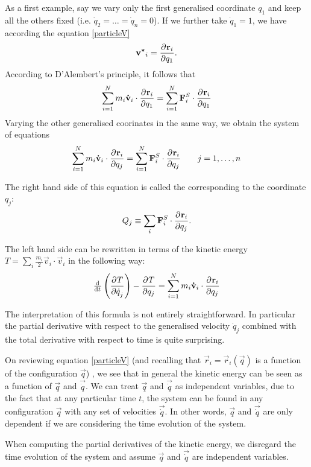 As a first example, say we vary only the first generalised coordinate $q_1$ and keep all the others fixed (i.e. $\dot{q}_2 = \ldots = \dot{q}_n = 0$). If we further take $\dot{q}_1 = 1$, we have according the equation \ref{particleV}
\[ \bm{\mathrm{v^*}}_i =  \frac{\partial{^{}}\bm{\mathrm{r}}_i}{\partial{{q_1}^{}}} . \]
According to D'Alembert's principle, it follows that
\[ \sum^N_{i=1}m_i \bm{\mathrm{\dot{v}}}_i \cdot  \frac{\partial{^{}}\bm{\mathrm{r}}_i}{\partial{{q_1}^{}}}  = \sum^N_{i=1}\bm{\mathrm{F}}^S_i  \cdot  \frac{\partial{^{}}\bm{\mathrm{r}}_i}{\partial{{q_1}^{}}}  \] 
Varying the other generalised coorinates in the same way, we obtain the system of equations
\begin{equation}
\sum^N_{i=1}m_i \bm{\mathrm{\dot{v}}}_i \cdot  \frac{\partial{^{}}\bm{\mathrm{r}}_i}{\partial{{q_j}^{}}}  = \sum^N_{i=1}\bm{\mathrm{F}}^S_i  \cdot  \frac{\partial{^{}}\bm{\mathrm{r}}_i}{\partial{{q_j}^{}}}  \qquad j = 1, \ldots , n \label{Lag1}
\end{equation}
 

The right hand side of this equation is called the  corresponding to the coordinate $q_j$:
\[ Q_j \equiv \sum_i \bm{\mathrm{F}}^S_i \cdot  \frac{\partial{^{}}\bm{\mathrm{r}}_i}{\partial{{q_j}^{}}} . \]

The left hand side can be rewritten in terms of the kinetic energy $T = \sum_i\frac{m_i}{2}\vec{v}_i \cdot \vec{v}_i$ in the following way:
\begin{equation}
\od{}{t}\left(\pd{T}{\dot{q}_j}\right) - \pd{T}{q_j} = \sum^N_{i=1}m_i \vec{\dot{v}}_i \cdot \pd{\vec{r}_i}{q_j} \label{kinRewrite}
\end{equation}


The interpretation of this formula is not entirely straightforward. In particular the partial derivative with respect to the generalised velocity $\dot{q}_j$ combined with the total derivative with respect to time is quite surprising.

On reviewing equation \ref{particleV} (and recalling that $\vec{r}_i = \vec{r}_i(\vec{q})$ is a function of the configuration $\vec{q}$) , we see that in general the kinetic energy can be seen as a function of $\vec{q}$ and $\vec{\dot{q}}$. We can treat $\vec{q}$ and $\vec{\dot{q}}$ as independent variables, due to the fact that at any particular time $t$, the system can be found in any configuration $\vec{q}$ with any set of velocities $\vec{\dot{q}}$. In other words, $\vec{q}$ and $\vec{\dot{q}}$ are only dependent if we are considering the time evolution of the system.

When computing the partial derivatives of the kinetic energy, we disregard the time evolution of the system and assume $\vec{q}$ and $\vec{\dot{q}}$ are independent variables.

